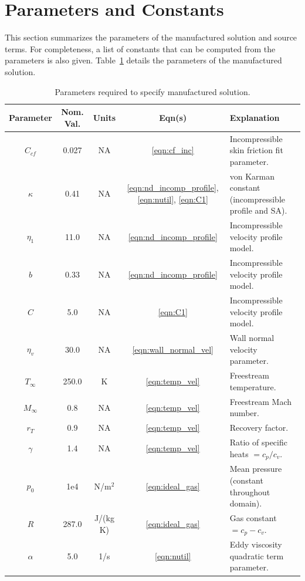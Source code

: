 \section{Parameters and Constants}
This section summarizes the parameters of the manufactured solution
and source terms.  For completeness, a list of constants that can be
computed from the parameters is also given.
%
Table~\ref{tbl:soln_parameters} details the parameters of the manufactured solution.
%
\begin{table}[ht]
\caption{Parameters required to specify manufactured solution.}
\begin{center}
\begin{tabular}{|c|c|c|c|l|}
\hline
Parameter & Nom. Val. & Units & Eqn(s) & Explanation \\
\hline
$C_{cf}$ & 0.027 & NA & \ref{eqn:cf_inc} & Incompressible skin friction fit parameter. \\
$\kappa$ & 0.41 & NA & \ref{eqn:nd_incomp_profile}, \ref{eqn:nutil}, \ref{eqn:C1} & von Karman constant (incompressible profile and SA). \\
$\eta_1$ & 11.0 & NA & \ref{eqn:nd_incomp_profile} & Incompressible velocity profile model. \\
$b$ & 0.33 & NA & \ref{eqn:nd_incomp_profile} & Incompressible velocity profile model. \\
$C$ & 5.0 & NA & \ref{eqn:C1} & Incompressible velocity profile model. \\
$\eta_v$ & 30.0 & NA & \ref{eqn:wall_normal_vel} & Wall normal velocity parameter. \\
$T_{\infty}$ & 250.0 & K & \ref{eqn:temp_vel} & Freestream temperature. \\
$M_{\infty}$ & 0.8 & NA & \ref{eqn:temp_vel} & Freestream Mach number. \\
$r_T$ & 0.9 & NA & \ref{eqn:temp_vel} & Recovery factor. \\
$\gamma$ & 1.4 & NA & \ref{eqn:temp_vel} & Ratio of specific heats $ = c_p/c_v$. \\
$p_0$ & 1e4 & N/m$^2$ & \ref{eqn:ideal_gas} & Mean pressure (constant throughout domain). \\
$R$ & 287.0 & J/(kg K) & \ref{eqn:ideal_gas} & Gas constant $ = c_p - c_v$. \\
$\alpha$ & 5.0 & 1/s & \ref{eqn:nutil} & Eddy viscosity quadratic term parameter. \\
\hline
\end{tabular}
\end{center}
\label{tbl:soln_parameters}
\end{table}
